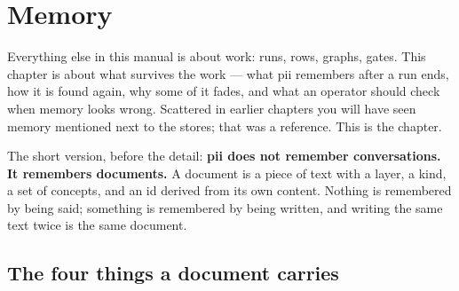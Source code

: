 \chapter{Memory}

\label{ch:memory}

Everything else in this manual is about work: runs, rows, graphs, gates. This chapter is about
what survives the work — what pii remembers after a run ends, how it is found again, why some of
it fades, and what an operator should check when memory looks wrong. Scattered in earlier
chapters you will have seen memory mentioned next to the stores; that was a reference. This is the
chapter.

The short version, before the detail: \textbf{pii does not remember conversations. It remembers
documents.} A document is a piece of text with a layer, a kind, a set of concepts, and an id
derived from its own content. Nothing is remembered by being said; something is remembered by
being written, and writing the same text twice is the same document.

\section{The four things a document carries}

\begin{center}
\end{center}

